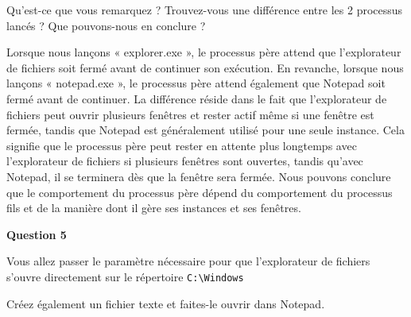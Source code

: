 \vspace{0.5cm}

\noindent Qu'est-ce que vous remarquez ? Trouvez-vous une différence entre les 2 processus lancés ? Que pouvons-nous en conclure ? \\

\begin{captionbox}
Lorsque nous lançons « explorer.exe », le processus père attend que l'explorateur de fichiers soit fermé avant de continuer son exécution. En revanche, lorsque nous lançons « notepad.exe », le processus père attend également que Notepad soit fermé avant de continuer. La différence réside dans le fait que l'explorateur de fichiers peut ouvrir plusieurs fenêtres et rester actif même si une fenêtre est fermée, tandis que Notepad est généralement utilisé pour une seule instance. Cela signifie que le processus père peut rester en attente plus longtemps avec l'explorateur de fichiers si plusieurs fenêtres sont ouvertes, tandis qu'avec Notepad, il se terminera dès que la fenêtre sera fermée. Nous pouvons conclure que le comportement du processus père dépend du comportement du processus fils et de la manière dont il gère ses instances et ses fenêtres.
\end{captionbox}

\newpage

\noindent \textbf{Question 5}

\noindent Vous allez passer le paramètre nécessaire pour que l'explorateur de fichiers s'ouvre directement sur le répertoire \texttt{C:\textbackslash Windows}

\noindent Créez également un fichier texte et faites-le ouvrir dans Notepad.

